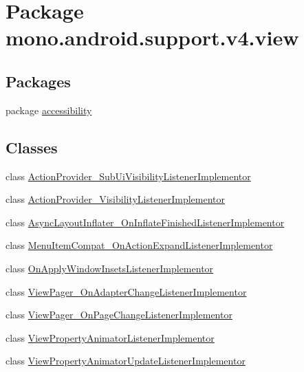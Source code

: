 \hypertarget{namespacemono_1_1android_1_1support_1_1v4_1_1view}{
\section{Package mono.android.support.v4.view}
\label{namespacemono_1_1android_1_1support_1_1v4_1_1view}
}
\subsection*{Packages}
\begin{CompactItemize}
\item 
package \hyperlink{namespacemono_1_1android_1_1support_1_1v4_1_1view_1_1accessibility}{accessibility}
\end{CompactItemize}
\subsection*{Classes}
\begin{CompactItemize}
\item 
class \hyperlink{classmono_1_1android_1_1support_1_1v4_1_1view_1_1_action_provider___sub_ui_visibility_listener_implementor}{ActionProvider\_\-SubUiVisibilityListenerImplementor}
\item 
class \hyperlink{classmono_1_1android_1_1support_1_1v4_1_1view_1_1_action_provider___visibility_listener_implementor}{ActionProvider\_\-VisibilityListenerImplementor}
\item 
class \hyperlink{classmono_1_1android_1_1support_1_1v4_1_1view_1_1_async_layout_inflater___on_inflate_finished_listener_implementor}{AsyncLayoutInflater\_\-OnInflateFinishedListenerImplementor}
\item 
class \hyperlink{classmono_1_1android_1_1support_1_1v4_1_1view_1_1_menu_item_compat___on_action_expand_listener_implementor}{MenuItemCompat\_\-OnActionExpandListenerImplementor}
\item 
class \hyperlink{classmono_1_1android_1_1support_1_1v4_1_1view_1_1_on_apply_window_insets_listener_implementor}{OnApplyWindowInsetsListenerImplementor}
\item 
class \hyperlink{classmono_1_1android_1_1support_1_1v4_1_1view_1_1_view_pager___on_adapter_change_listener_implementor}{ViewPager\_\-OnAdapterChangeListenerImplementor}
\item 
class \hyperlink{classmono_1_1android_1_1support_1_1v4_1_1view_1_1_view_pager___on_page_change_listener_implementor}{ViewPager\_\-OnPageChangeListenerImplementor}
\item 
class \hyperlink{classmono_1_1android_1_1support_1_1v4_1_1view_1_1_view_property_animator_listener_implementor}{ViewPropertyAnimatorListenerImplementor}
\item 
class \hyperlink{classmono_1_1android_1_1support_1_1v4_1_1view_1_1_view_property_animator_update_listener_implementor}{ViewPropertyAnimatorUpdateListenerImplementor}
\end{CompactItemize}
